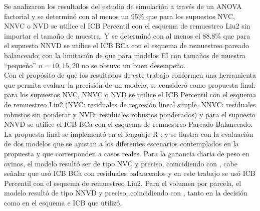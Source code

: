 Se analizaron los resultados del estudio de simulación a través de un ANOVA factorial y se determinó con al menos un 95\% que para los supuestos NVC, NNVC o NVD se utilice el ICB Percentil con el esquema de remuestreo Liu2 sin importar el tamaño de muestra. Y se determinó con al menos el 88.8\% que para el supuesto NNVD se utilice el ICB BCa con el esquema de remuestreo pareado balanceado; con la limitación de que para modelos EI con tamaños de muestra “pequeño” $n=10, 15, 20$ no se obtuvo un buen desempeño. \\


Con el propósito de que los resultados de este trabajo conformen una herramienta que permita evaluar la precisión de un modelo, se consideró como propuesta final: para los supuestos NVC, NNVC o NVD se utilice el ICB Percentil con el esquema de remuestreo Liu2 (NVC: residuales de regresión lineal simple, NNVC: residuales robustos sin ponderar y NVD: residuales robustos ponderados) y para el supuesto NNVD se utilice el ICB BCa con el esquema de remuestreo Pareado Balanceado. La propuesta final se implementó en el lenguaje R \parencite{R-2024}; y se ilustra con la evaluación de dos modelos que se ajustan a los diferentes escenarios contemplados en la propuesta y que corresponden a casos reales. Para la ganancia diaria de peso en ovinos, el modelo resultó ser de tipo NVC y preciso, coincidiendo con \textcite{balam-2012}, cabe señalar que usó ICB BCa con residuales balanceados y en este trabajo se usó ICB Percentil con el esquema de remuestreo Liu2. Para el volumen por parcela, el modelo resultó de tipo NNVD y preciso, coincidiendo con \textcite{balam-2012}, tanto en la decisión como en el esquema e ICB que utilizó.